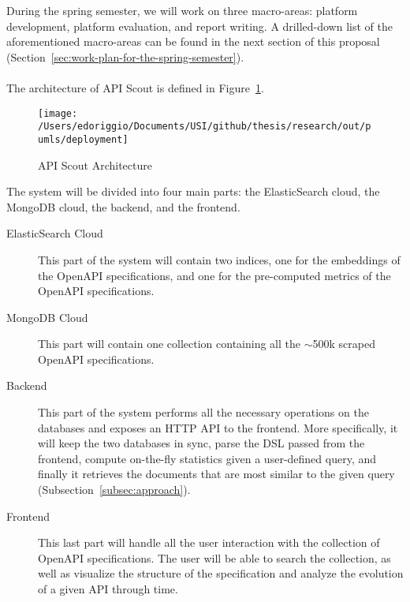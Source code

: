 During the spring semester, we will work on three macro-areas: platform development, platform evaluation, and report writing.
A drilled-down list of the aforementioned macro-areas can be found in the next section of this proposal (Section~\ref{sec:work-plan-for-the-spring-semester}). \\ \\
The architecture of API Scout is defined in Figure~\ref{fig:platform-architecture}.
\begin{figure}
    \centering
    \texttt{[image: /Users/edoriggio/Documents/USI/github/thesis/research/out/pumls/deployment]}
    \caption{API Scout Architecture}
    \label{fig:platform-architecture}
\end{figure}
The system will be divided into four main parts: the ElasticSearch cloud, the MongoDB cloud, the backend, and the frontend.
\begin{description}
    \item[ElasticSearch Cloud] This part of the system will contain two indices, one for the embeddings of the OpenAPI specifications, and one for the pre-computed metrics of the OpenAPI specifications.
    \item[MongoDB Cloud] This part will contain one collection containing all the $\sim$500k scraped OpenAPI specifications.
    \item[Backend] This part of the system performs all the necessary operations on the databases and exposes an HTTP API to the frontend.
    More specifically, it will keep the two databases in sync, parse the DSL passed from the frontend, compute on-the-fly statistics given a user-defined query, and finally it retrieves the documents that are most similar to the given query (Subsection~\ref{subsec:approach}).
    \item[Frontend] This last part will handle all the user interaction with the collection of OpenAPI specifications.
    The user will be able to search the collection, as well as visualize the structure of the specification and analyze the evolution of a given API through time.
\end{description}
